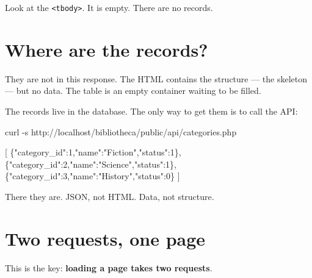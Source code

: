 \documentclass[11pt,a4paper,oneside]{book}
\newenvironment{Shaded}{\begin{snugshade}}{\end{snugshade}}
\newcommand{\DataTypeTok}[1]{\textcolor[HTML]{902000}{#1}}
\newcommand{\DecValTok}[1]{\textcolor[HTML]{40A070}{#1}}
\newcommand{\StringTok}[1]{\textcolor[HTML]{4070A0}{#1}}
\newcommand{\OtherTok}[1]{\textcolor[HTML]{007020}{#1}}
\newcommand{\FunctionTok}[1]{\textcolor[HTML]{06287E}{#1}}
\newcommand{\ExtensionTok}[1]{#1}
\newcommand{\AttributeTok}[1]{\textcolor[HTML]{7D9029}{#1}}
\newcommand{\NormalTok}[1]{#1}
\begin{document}
Look at the \texttt{\textless{}tbody\textgreater{}}. It is empty.
There are no records.

\hypertarget{where-are-the-records}{%
\section{Where are the records?}\label{where-are-the-records}}

They are not in this response. The HTML contains the structure
--- the skeleton --- but no data. The table is an empty container
waiting to be filled.

The records live in the database. The only way to get them is to
call the API:

\begin{Shaded}
\begin{Highlighting}[]
\ExtensionTok{curl} \AttributeTok{{-}s}\NormalTok{ http://localhost/bibliotheca/public/api/categories.php}
\end{Highlighting}
\end{Shaded}

\begin{Shaded}
\begin{Highlighting}[]
\OtherTok{[}
  \FunctionTok{\{}\DataTypeTok{"category\_id"}\FunctionTok{:}\DecValTok{1}\FunctionTok{,}\DataTypeTok{"name"}\FunctionTok{:}\StringTok{"Fiction"}\FunctionTok{,}\DataTypeTok{"status"}\FunctionTok{:}\DecValTok{1}\FunctionTok{\}}\OtherTok{,}
  \FunctionTok{\{}\DataTypeTok{"category\_id"}\FunctionTok{:}\DecValTok{2}\FunctionTok{,}\DataTypeTok{"name"}\FunctionTok{:}\StringTok{"Science"}\FunctionTok{,}\DataTypeTok{"status"}\FunctionTok{:}\DecValTok{1}\FunctionTok{\}}\OtherTok{,}
  \FunctionTok{\{}\DataTypeTok{"category\_id"}\FunctionTok{:}\DecValTok{3}\FunctionTok{,}\DataTypeTok{"name"}\FunctionTok{:}\StringTok{"History"}\FunctionTok{,}\DataTypeTok{"status"}\FunctionTok{:}\DecValTok{0}\FunctionTok{\}}
\OtherTok{]}
\end{Highlighting}
\end{Shaded}

There they are. JSON, not HTML. Data, not structure.

\hypertarget{two-requests-one-page}{%
\section{Two requests, one page}\label{two-requests-one-page}}

This is the key: \textbf{loading a page takes two requests}.
\end{document}
